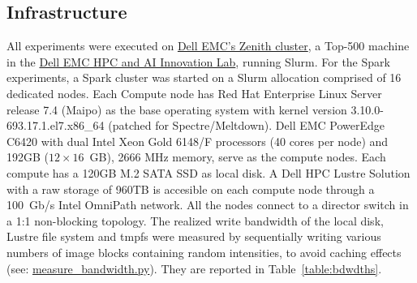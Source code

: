 




\subsection{Infrastructure} %

 All experiments were executed on 
 \href{https://www.dellemc.com/resources/en-us/asset/sales-documents/products/storage/h16221-hpc-lab-brochure.pdf}{Dell 
 EMC's Zenith cluster}, a Top-500 machine in the 
 \href{https://www.dellemc.com/en-us/solutions/high-performance-computing/HPC-AI-Innovation-Lab.htm}{Dell 
 EMC HPC and AI Innovation Lab}, running Slurm. For the Spark 
 experiments, a Spark cluster was started on a
 Slurm allocation comprised of 16 dedicated nodes.
 Each Compute node has Red Hat Enterprise Linux Server release 7.4 (Maipo) 
 as the base operating system with kernel version 3.10.0-693.17.1.el7.x86\_64
 (patched for Spectre/Meltdown). Dell EMC PowerEdge C6420 with dual Intel Xeon
 Gold 6148/F processors (40 cores per node) and 192GB ($12\times16$~GB), 2666 MHz
 memory, serve as the compute nodes. Each compute has a 120GB M.2 SATA SSD as 
 local disk. A Dell HPC Lustre Solution with a raw storage of 960TB is 
 accesible on each compute node through a 100~Gb/s Intel OmniPath network. All
 the nodes connect to a director switch in a 1:1 non-blocking topology.
 The realized write bandwidth of the local disk, 
 Lustre file system and tmpfs were measured by sequentially writing various numbers
 of image blocks containing random intensities, to avoid 
 caching effects (see: \href{https://github.com/big-data-lab-team/paper-in-mem-locality/blob/master/benchmark_scripts/measure_bandwidth.py}{measure\_bandwidth.py}).
 They are reported in Table~\ref{table:bdwdths}.

